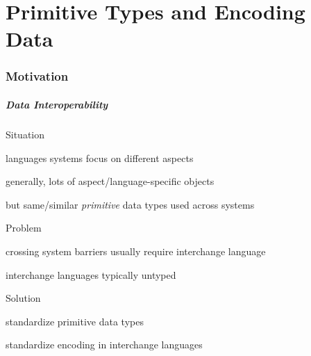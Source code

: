 \part{Primitive Types and Encoding Data}

\section{Motivation}

\begin{frame}\frametitle{Data Interoperability}
\begin{blockitems}{Situation}
 \item languages systems focus on different aspects
 \item generally, lots of aspect/language-specific objects
 \item but same/similar \emph{primitive} data types used across systems
 \end{blockitems}
 
\begin{blockitems}{Problem}
 \item crossing system barriers usually require interchange language
 \item interchange languages typically untyped
\end{blockitems}

\begin{blockitems}{Solution}
 \item standardize primitive data types
 \item standardize encoding in interchange languages
\end{blockitems}
\end{frame}

